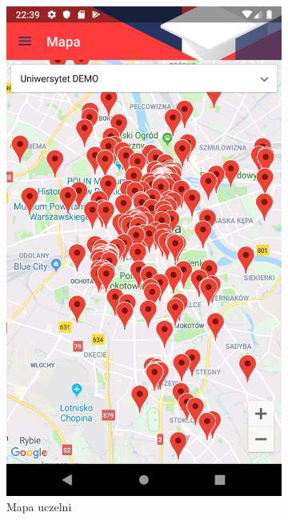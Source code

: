 \documentclass{pracamgr}
\begin{document}
\begin{figure}[p]
	\centering
	\begin{subfigure}[t]{0.3\textwidth}
		\includegraphics[width=\textwidth]{img/map_map.png}
		\caption{Mapa uczelni}
		\label{fig:map_map}
	\end{subfigure}
	\quad
	\begin{subfigure}[t]{0.3\textwidth}

\end{subfigure}
\end{figure}
\end{document}
